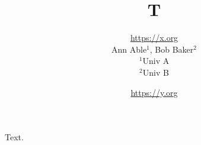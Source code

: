 \documentclass{article}
\title{T}
\author{\url{https://x.org} \\ Ann Able$^1$, Bob Baker$^2$ \\ $^1$Univ A \\ $^2$Univ B \and \url{https://y.org}}
\begin{document}
\maketitle
Text.
\end{document}

